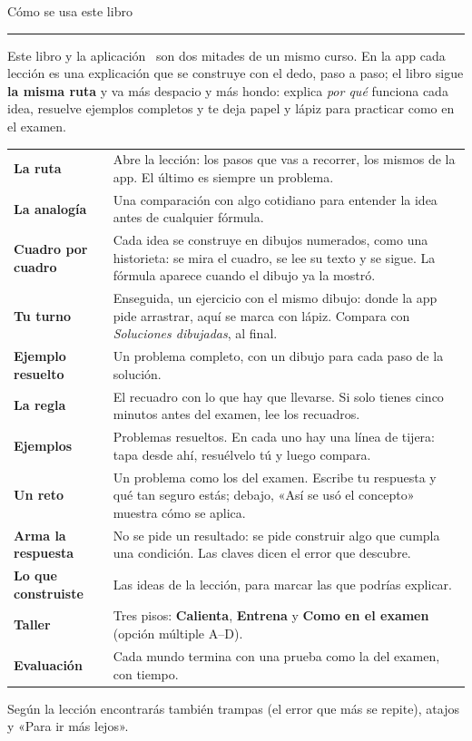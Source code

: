 \cleardoublepage
\thispagestyle{vacia}
{\sffamily\fontsize{26}{30}\selectfont\firalight Cómo se usa este libro\par}\vspace{2pt}
{\color{zolive}\rule{18mm}{1.6pt}}\par\vspace{8pt}

Este libro y la aplicación \marca\ son dos mitades de un mismo curso. En la app cada lección es una explicación que se
construye con el dedo, paso a paso; el libro sigue \textbf{la misma ruta} y va más despacio y más hondo: explica \emph{por qué}
funciona cada idea, resuelve ejemplos completos y te deja papel y lápiz para practicar como en el examen.

\vspace{4pt}
\begin{tabularx}{\linewidth}{@{}>{\leavevmode\sffamily\small\bfseries\color{zolive}}p{32mm}X@{}}
La ruta & Abre la lección: los pasos que vas a recorrer, los mismos de la app. El último es siempre un problema.\\[4pt]
La analogía & Una comparación con algo cotidiano para entender la idea antes de cualquier fórmula.\\[4pt]
Cuadro por cuadro & Cada idea se construye en dibujos numerados, como una historieta: se mira el cuadro, se lee su texto y
se sigue. La fórmula aparece cuando el dibujo ya la mostró.\\[4pt]
Tu turno & Enseguida, un ejercicio con el mismo dibujo: donde la app pide arrastrar, aquí se marca con lápiz. Compara con
\emph{Soluciones dibujadas}, al final.\\[4pt]
Ejemplo resuelto & Un problema completo, con un dibujo para cada paso de la solución.\\[4pt]
La regla & El recuadro con lo que hay que llevarse. Si solo tienes cinco minutos antes del examen, lee los recuadros.\\[4pt]
Ejemplos & Problemas resueltos. En cada uno hay una línea de tijera: tapa desde ahí, resuélvelo tú y luego compara.\\[4pt]
Un reto & Un problema como los del examen. Escribe tu respuesta y qué tan seguro estás; debajo, «Así se usó el concepto» muestra cómo se aplica.\\[4pt]
Arma la respuesta & No se pide un resultado: se pide construir algo que cumpla una condición. Las claves dicen el error que descubre.\\[4pt]
Lo que construiste & Las ideas de la lección, para marcar las que podrías explicar.\\[4pt]
Taller & Tres pisos: \textbf{Calienta}, \textbf{Entrena} y \textbf{Como en el examen} (opción múltiple A–D).\\[4pt]
Evaluación & Cada mundo termina con una prueba como la del examen, con tiempo.\\[4pt]
\end{tabularx}
{\small\color{zmute}Según la lección encontrarás también trampas (el error que más se repite), atajos y «Para ir más lejos».\par}

